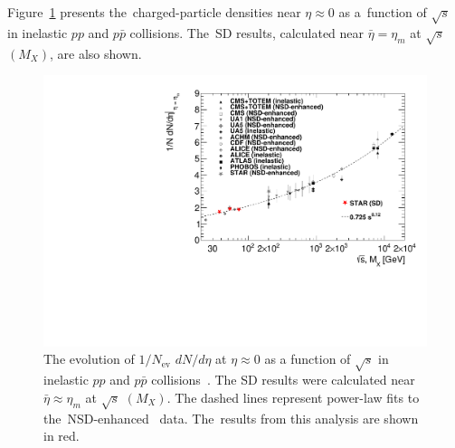 Figure~\ref{fig:comparison_eta} presents the~charged-particle densities near $\eta\approx 0$ as a~function of $\sqrt{s}$ in inelastic $pp$ and $p\bar{p}$ collisions. The~SD results, calculated near $\bar{\eta}=\eta_{m}$ at $\sqrt{s}$ $(M_X)$, are also shown.  
\begin{figure}[b!]
	\centering
	\includegraphics[width=1\textwidth,page=1]{chapters/discussion/img/dNdeta_sqrts.pdf}
	\vspace{-0.3cm}
	\caption{The evolution of $1/N_\textrm{ev}$ $dN/d\eta$ at $\eta\approx 0$ as a function of $\sqrt{s}$ in inelastic $pp$ and $p\bar{p}$ collisions~\cite{CMS:intro_3,UA1:intro_1,UA5:comparison,ISR:comparison,CDF:intro_2,ALICE:comparison,ATLAS:charged100,ATLAS:intro_2,ATLAS:intro_1,STAR:spectra,PHOBOS:intro,CMS:intro_1}. The SD results were calculated near $\bar{\eta}\approx\eta_{m}$  at $\sqrt{s}$ $(M_X)$. The dashed lines represent power-law fits to the~NSD-enhanced~\cite{CMS:intro_3} data.
		The~results from this analysis are shown in red. }
	\label{fig:comparison_eta}
\end{figure}

 



 

